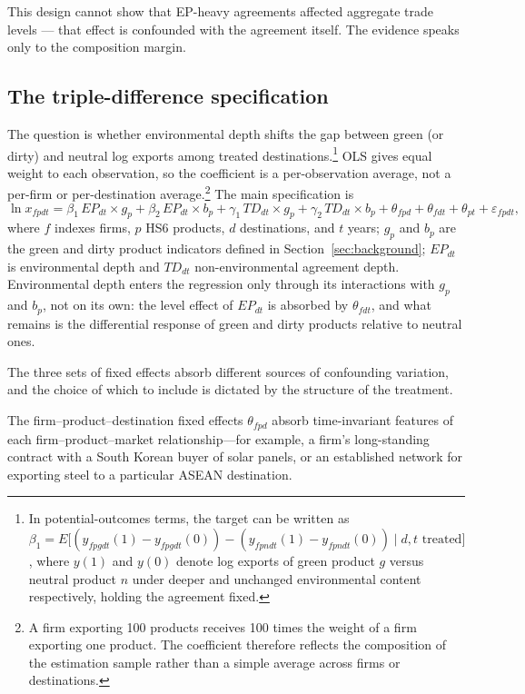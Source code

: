 \documentclass[12pt]{article}
\begin{document}
This design cannot show that EP-heavy agreements affected aggregate trade levels --- that effect is confounded with the agreement itself. The evidence speaks only to the composition margin.

\subsection{The triple-difference specification}

The question is whether environmental depth shifts the gap between green (or dirty)
and neutral log exports among treated
destinations.\footnote{In potential-outcomes terms, the target can be written as
$\beta_1 = E\bigl[(y_{fpgdt}(1)-y_{fpgdt}(0)) - (y_{fpndt}(1)-y_{fpndt}(0))
\mid d,t \text{ treated}\bigr]$, where $y(1)$ and $y(0)$ denote log exports of
green product $g$ versus neutral product $n$ under deeper and unchanged environmental
content respectively, holding the agreement fixed.}
OLS gives equal weight to each observation, so the coefficient is a
per-observation average, not a per-firm or per-destination average.\footnote{A firm exporting 100 products receives 100 times the weight of a firm exporting one product. The coefficient therefore reflects the composition of the estimation sample rather than a simple average across firms or destinations.} The main
specification is
\begin{equation}\label{eq:main}
\ln x_{fpdt} = \beta_1\, EP_{dt}\!\times\!g_p + \beta_2\, EP_{dt}\!\times\!b_p
+ \gamma_1\, TD_{dt}\!\times\!g_p + \gamma_2\, TD_{dt}\!\times\!b_p
+ \theta_{fpd} + \theta_{fdt} + \theta_{pt} + \varepsilon_{fpdt},
\end{equation}
where $f$ indexes firms, $p$ HS6 products, $d$ destinations, and $t$ years; $g_p$
and $b_p$ are the green and dirty product indicators defined in
Section~\ref{sec:background}; $EP_{dt}$ is environmental depth and $TD_{dt}$
non-environmental agreement depth. Environmental depth enters the regression only
through its interactions with $g_p$ and $b_p$, not on its own: the level effect of
$EP_{dt}$ is absorbed by $\theta_{fdt}$, and what remains is the differential
response of green and dirty products relative to neutral ones.

The three sets of fixed effects absorb different sources of confounding variation,
and the choice of which to include is dictated by the structure of the treatment.

The firm--product--destination fixed effects $\theta_{fpd}$ absorb time-invariant
features of each firm--product--market relationship---for example, a firm's
long-standing contract with a South Korean buyer of solar panels, or an established
network for exporting steel to a particular ASEAN destination.
\end{document}

